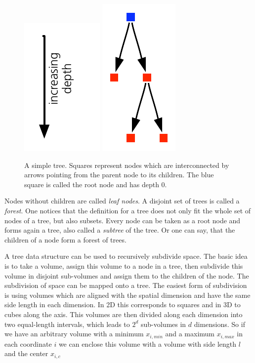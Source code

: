 \begin{figure}[htbp]
\begin{center}
\includegraphics[scale=1.0]{10tree_depth.pdf}
\includegraphics{08simpletree.pdf}
\caption{A simple tree. Squares represent nodes which are interconnected by arrows pointing from the parent node to its children. The blue square is called the root node and has depth $0$.}
\label{ch02_grav02_fig01}
\end{center}
\end{figure}

Nodes without children are called \emph{leaf nodes}. A disjoint set of trees is called a \emph{forest}. One notices that the definition for a tree does not only fit the whole set of nodes of a tree, but also subsets. Every node can be taken as a root node and forms again a tree, also called a \emph{subtree} of the tree. Or one can say, that the children of a node form a forest of trees.

A tree data structure can be used to recursively subdivide space. The basic idea is to take a volume, assign this volume to a node in a tree, then subdivide this volume in disjoint sub-volumes and assign them to the children of the node. The subdivision of space can be mapped onto a tree. The easiest form of subdivision is using volumes which are aligned with the spatial dimension and have the same side length in each dimension. In 2D this corresponds to squares and in 3D to cubes along the axis. This volumes are then divided along each dimension into two equal-length intervals, which leads to $2^d$ sub-volumes in $d$ dimensions. So if we have an arbitrary volume with a minimum $x_{i,min}$ and a maximum $x_{i,max}$ in each coordinate $i$ we can enclose this volume with a volume with side length $l$ and the center $x_{i,c}$

